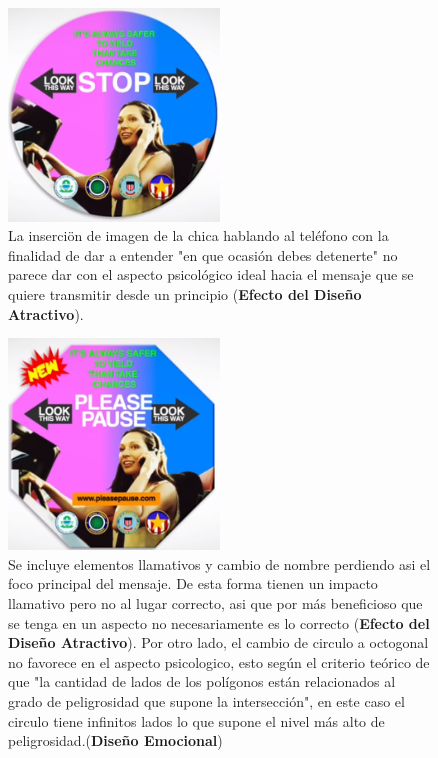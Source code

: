 \documentclass[a4paper,12pt]{article}
\begin{document}
\begin{figure}
\caption{La inserciön de imagen de la chica hablando al teléfono con la finalidad de dar a entender "en que ocasión debes detenerte" no parece dar con el aspecto psicológico ideal hacia el mensaje que se quiere transmitir desde un principio (\textbf{Efecto del Diseño Atractivo}).}
\includegraphics[width=0.5\textwidth]{logop3}
\end{figure}

\begin{figure}
\caption{Se incluye elementos llamativos y cambio de nombre perdiendo asi el foco principal del mensaje. De esta forma tienen un impacto llamativo pero no al lugar correcto, asi que por más beneficioso que se tenga en un aspecto no necesariamente es lo correcto (\textbf{Efecto del Diseño Atractivo}). Por otro lado, el cambio de circulo a octogonal no favorece en el aspecto psicologico, esto según el criterio teórico de que "la cantidad de lados de los polígonos están relacionados al grado de peligrosidad que supone la intersección", en este caso el circulo tiene infinitos lados lo que supone el nivel más alto de peligrosidad.(\textbf{Diseño Emocional})}
\includegraphics[width=0.5\textwidth]{logop4}
\end{figure}
\end{document}
